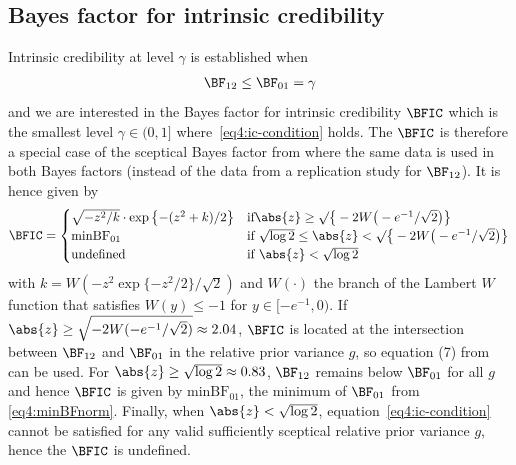 \begin{subappendices}
\section{Bayes factor for intrinsic credibility}
\label{app:BFIC}
Intrinsic credibility at level $\gamma$ is established when
\begin{align}
  \label{eq4:ic-condition}
  \BF_{12} \leq \BF_{01} = \gamma
\end{align}
and we are interested in the Bayes factor for intrinsic credibility $\BFIC$
which is the smallest level $\gamma \in (0, 1]$ where~\eqref{eq4:ic-condition}
holds. The $\BFIC$ is therefore a special case of the sceptical Bayes factor
from \citet{Pawel2020b} where the same data is used in both Bayes factors
(instead of the data from a replication study for $\BF_{12}$). It is hence given
by
\begin{align}
  \label{eq4:BFic}
  \BFIC =
  \begin{cases}
    \sqrt{-z^{2}/k}\cdot \exp\left\{-(z^{2} + k)/2\right\}
    & \text{if} \abs{z} \geq \surd\big\{-2 W\big(-e^{-1}/\sqrt2\big)\big\}\\
    \mbox{minBF}_{01} \
    & \text{if} ~ \sqrt{\log 2} \leq \abs{z} < \surd\big\{-2 W\big(-e^{-1}/\sqrt2\big)\big\} \\
    \text{undefined}
    & \text{if} ~ \abs{z} < \sqrt{\log 2}
  \end{cases}
\end{align}
with $k = W(-z^{2} \exp\{-z^{2}/2\}/\sqrt{2})$ and $W(\cdot)$ the branch of the
Lambert $W$ function that satisfies $W(y) \leq -1$ for $y \in [-e^{-1}, 0).$ If
$\abs{z} \geq \sqrt{-2 W(-e^{-1}/\sqrt2)} \approx 2.04$, $\BFIC$ is located at
the intersection between $\BF_{12}$ and $\BF_{01}$ in the relative prior
variance $g$, so equation (7) from \citet{Pawel2020b} can be used. For
$\abs{z} \geq \sqrt{\log 2} \approx 0.83$, $\BF_{12}$ remains below $\BF_{01}$
for all $g$ and hence $\BFIC$ is given by $\mbox{minBF}_{01}$, the minimum of
$\BF_{01}$ from \eqref{eq4:minBFnorm}. Finally, when $\abs{z} < \sqrt{\log 2}$,
equation~\eqref{eq4:ic-condition} cannot be satisfied for any valid sufficiently
sceptical relative prior variance $g$, hence the $\BFIC$ is undefined.

\end{subappendices}



